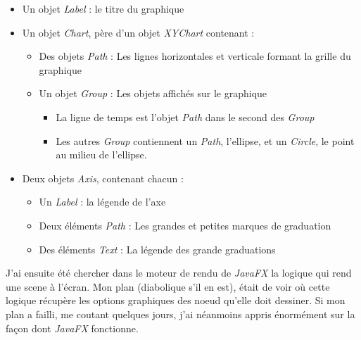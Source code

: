 \begin{itemize}
\item Un objet \textit{Label} : le titre du graphique
\item Un objet \textit{Chart}, père d'un objet \textit{XYChart} contenant :
  \begin{itemize}
  \item Des objets \textit{Path} : Les lignes horizontales et verticale formant la grille du graphique
  \item Un objet \textit{Group} : Les objets affichés sur le graphique
    \begin{itemize}
    \item La ligne de temps est l'objet \textit{Path} dans le second des \textit{Group}
    \item Les autres \textit{Group} contiennent un \textit{Path}, l'ellipse, et un \textit{Circle}, le point au milieu de l'ellipse.
    \end{itemize}
  \end{itemize}
\item Deux objets \textit{Axis}, contenant chacun :
  \begin{itemize}
  \item Un \textit{Label} : la légende de l'axe
  \item Deux éléments \textit{Path} : Les grandes et petites marques de graduation
  \item Des éléments \textit{Text} : La légende des grande graduations
  \end{itemize}
\end{itemize}

J'ai ensuite été chercher dans le moteur de rendu de \textit{JavaFX} la logique qui rend une scene à l'écran. Mon plan (diabolique s'il en est), était de voir où cette logique récupère les options graphiques des noeud qu'elle doit dessiner. Si mon plan a failli, me coutant quelques jours, j'ai néanmoins appris énormément sur la façon dont \textit{JavaFX} fonctionne. 


